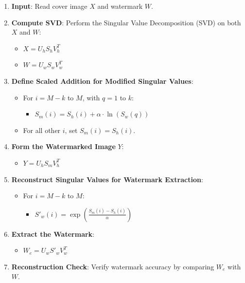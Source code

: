 \documentclass[
  journal,
]{IEEEtran}%
\providecommand{\tightlist}{%
  \setlength{\itemsep}{0pt}\setlength{\parskip}{0pt}}\usepackage{longtable,booktabs,array}
\begin{document}
\begin{enumerate}
\def\labelenumi{\arabic{enumi}.}
\item
  \textbf{Input}: Read cover image \(X\) and watermark \(W\).
\item
  \textbf{Compute SVD}: Perform the Singular Value Decomposition (SVD)
  on both \(X\) and \(W\):

  \begin{itemize}
  \tightlist
  \item
    \(X = U_h S_h V_h^T\)
  \item
    \(W = U_w S_w V_w^T\)
  \end{itemize}
\item
  \textbf{Define Scaled Addition for Modified Singular Values}:

  \begin{itemize}
  \tightlist
  \item
    For \(i = M - k\) to \(M\), with \(q = 1\) to \(k\):

    \begin{itemize}
    \tightlist
    \item
      \(S_m(i) = S_h(i) + \alpha \cdot \ln(S_w(q))\)
    \end{itemize}
  \item
    For all other \(i\), set \(S_m(i) = S_h(i)\).
  \end{itemize}
\item
  \textbf{Form the Watermarked Image} \(Y\):

  \begin{itemize}
  \tightlist
  \item
    \(Y = U_h S_m V_h^T\)
  \end{itemize}
\item
  \textbf{Reconstruct Singular Values for Watermark Extraction}:

  \begin{itemize}
  \tightlist
  \item
    For \(i = M - k\) to \(M\):

    \begin{itemize}
    \tightlist
    \item
      \(S'_w(i) = \exp\left(\frac{S_m(i) - S_h(i)}{\alpha}\right)\)
    \end{itemize}
  \end{itemize}
\item
  \textbf{Extract the Watermark}:

  \begin{itemize}
  \tightlist
  \item
    \(W_e = U_w S'_w V_w^T\)
  \end{itemize}
\item
  \textbf{Reconstruction Check}: Verify watermark accuracy by comparing
  \(W_e\) with \(W\).
\end{enumerate}
\end{document}
